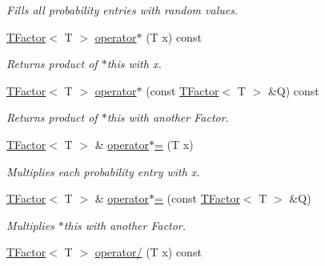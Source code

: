 \begin{CompactItemize}
\begin{CompactList}\small\item\em Fills all probability entries with random values. \item\end{CompactList}\item 
\hypertarget{classdai_1_1TFactor_cf5fc0dd70aa8a7e7c2da3b3acdf6747}{
\hyperlink{classdai_1_1TFactor}{TFactor}$<$ T $>$ \hyperlink{classdai_1_1TFactor_cf5fc0dd70aa8a7e7c2da3b3acdf6747}{operator$\ast$} (T x) const }
\label{classdai_1_1TFactor_cf5fc0dd70aa8a7e7c2da3b3acdf6747}

\begin{CompactList}\small\item\em Returns product of $\ast$this with x. \item\end{CompactList}\item 
\hypertarget{classdai_1_1TFactor_53f052f85f5274b783eaa1ecd31a6b35}{
\hyperlink{classdai_1_1TFactor}{TFactor}$<$ T $>$ \hyperlink{classdai_1_1TFactor_53f052f85f5274b783eaa1ecd31a6b35}{operator$\ast$} (const \hyperlink{classdai_1_1TFactor}{TFactor}$<$ T $>$ \&Q) const }
\label{classdai_1_1TFactor_53f052f85f5274b783eaa1ecd31a6b35}

\begin{CompactList}\small\item\em Returns product of $\ast$this with another Factor. \item\end{CompactList}\item 
\hypertarget{classdai_1_1TFactor_e8a33191e3bc570737ff29e77966c33e}{
\hyperlink{classdai_1_1TFactor}{TFactor}$<$ T $>$ \& \hyperlink{classdai_1_1TFactor_e8a33191e3bc570737ff29e77966c33e}{operator$\ast$=} (T x)}
\label{classdai_1_1TFactor_e8a33191e3bc570737ff29e77966c33e}

\begin{CompactList}\small\item\em Multiplies each probability entry with x. \item\end{CompactList}\item 
\hypertarget{classdai_1_1TFactor_914cb4b11fdffa4daaebf645f539d5d1}{
\hyperlink{classdai_1_1TFactor}{TFactor}$<$ T $>$ \& \hyperlink{classdai_1_1TFactor_914cb4b11fdffa4daaebf645f539d5d1}{operator$\ast$=} (const \hyperlink{classdai_1_1TFactor}{TFactor}$<$ T $>$ \&Q)}
\label{classdai_1_1TFactor_914cb4b11fdffa4daaebf645f539d5d1}

\begin{CompactList}\small\item\em Multiplies $\ast$this with another Factor. \item\end{CompactList}\item 
\hypertarget{classdai_1_1TFactor_35fd7313a64a83aba0cd087d1b60289d}{
\hyperlink{classdai_1_1TFactor}{TFactor}$<$ T $>$ \hyperlink{classdai_1_1TFactor_35fd7313a64a83aba0cd087d1b60289d}{operator/} (T x) const }
\label{classdai_1_1TFactor_35fd7313a64a83aba0cd087d1b60289d}


\end{CompactItemize}
